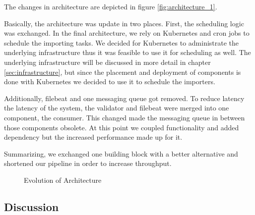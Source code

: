 The changes in architecture are depicted in figure \ref{fig:architecture_1}.

Basically, the architecture was update in two places. First, the scheduling logic was exchanged. In the
final architecture, we rely on Kubernetes and cron jobs to schedule the
importing tasks. We decided for Kubernetes to administrate the
underlying infrastructure thus it was feasible to use it for scheduling
as well. The underlying infrastructure will be discussed in more detail
in chapter \ref{sec:infrastructure}, but since the placement and deployment
of components is done with Kubernetes we decided to use it to schedule
the importers.

Additionally, filebeat and one messaging queue got removed. To reduce
latency the latency of the system, the validator and filebeat were
merged into one component, the consumer. This changed made the messaging
queue in between those components obsolete. At this point we coupled
functionality and added dependency but the increased performance made up
for it.

Summarizing, we exchanged one building block with a better alternative
and shortened our pipeline in order to increase throughput.

\begin{figure}
	\caption{Evolution of Architecture}
	\label{fig:evol_architecture}
\end{figure}

\subsection{Discussion}\label{discussion}

